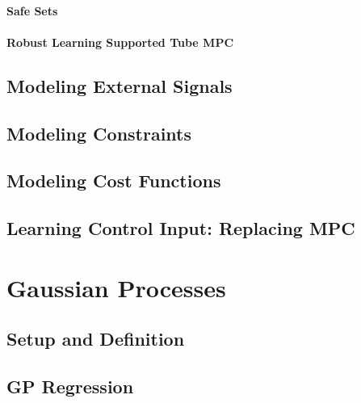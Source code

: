                 \paragraph{Safe Sets} %

                \paragraph{Robust Learning Supported Tube MPC} %

        \subsection{Modeling External Signals} %

        \subsection{Modeling Constraints} %

        \subsection{Modeling Cost Functions} %

        \subsection{Learning Control Input: Replacing MPC} %

    \section{Gaussian Processes} %

        \subsection{Setup and Definition} %

        \subsection{GP Regression} %

